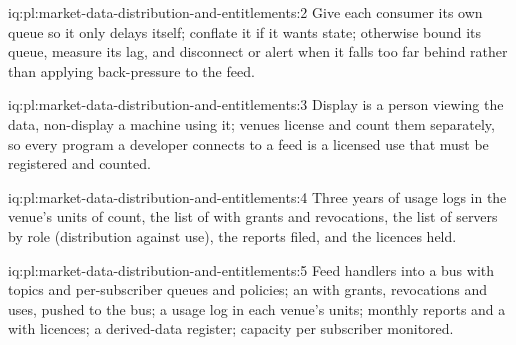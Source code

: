 \begin{solution}{iq:pl:market-data-distribution-and-entitlements:2}
Give each consumer its own queue so it only delays itself; conflate it if it wants state; otherwise bound its queue, measure its lag, and
disconnect or alert when it falls too far behind rather than applying back-pressure to the feed.
\end{solution}

\begin{solution}{iq:pl:market-data-distribution-and-entitlements:3}
Display is a person viewing the data, non-display a machine using it; venues license and count them separately, so every program a developer
connects to a feed is a licensed use that must be registered and counted.
\end{solution}

\begin{solution}{iq:pl:market-data-distribution-and-entitlements:4}
Three years of usage logs in the venue's units of count, the list of  with grants and revocations, the list of servers by role
(distribution against use), the reports filed, and the licences held.
\end{solution}

\begin{solution}{iq:pl:market-data-distribution-and-entitlements:5}
Feed handlers into a bus with topics and per-subscriber queues and policies; an  with grants, revocations and uses, pushed
to the bus; a usage log in each venue's units; monthly reports and a  with licences; a derived-data register; capacity per
subscriber monitored.
\end{solution}
